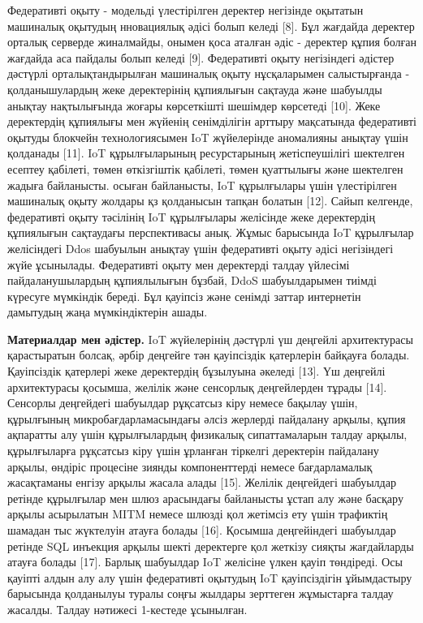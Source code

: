Федеративті оқыту - модельді үлестірілген деректер негізінде оқытатын
машиналық оқытудың нновациялық әдісі болып келеді {[}8{]}. Бұл жағдайда
деректер орталық серверде жиналмайды, онымен қоса аталған әдіс -
деректер құпия болған жағдайда аса пайдалы болып келеді {[}9{]}.
Федеративті оқыту негізіндегі әдістер дәстүрлі орталықтандырылған
машиналық оқыту нұсқаларымен салыстырғанда - қолданышулардың жеке
деректерінің құпиялығын сақтауда және шабуылды анықтау нақтылығында
жоғары көрсеткішті шешімдер көрсетеді {[}10{]}. Жеке деректердің
құпиялығы мен жүйенің сенімділігін арттыру мақсатында федеративті
оқытуды блокчейн технологиясымен IoT жүйелерінде аномалияны анықтау үшін
қолданады {[}11{]}. IoT құрылғыларының ресурстарының жетіспеушілігі
шектелген есептеу қабілеті, төмен өткізгіштік қабілеті, төмен қуаттылығы
және шектелген жадыға байланысты. осыған байланысты, IoT құрылғылары
үшін үлестірілген машиналық оқыту жолдары қз қолданысын тапқан болатын
{[}12{]}. Сайып келгенде, федеративті оқыту тәсілінің IoT құрылғылары
желісінде жеке деректердің құпиялығын сақтаудағы перспективасы анық.
Жұмыс барысында IoT құрылғылар желісіндегі Ddos шабуылын анықтау үшін
федеративті оқыту әдісі негізіндегі жүйе ұсынылады. Федеративті оқыту
мен деректерді талдау үйлесімі пайдаланушылардың құпиялылығын бұзбай,
DdoS шабуылдарымен тиімді күресуге мүмкіндік береді. Бұл қауіпсіз және
сенімді заттар интернетін дамытудың жаңа мүмкіндіктерін ашады.

{\bfseries Материалдар мен әдістер.} IoT жүйелерінің дәстүрлі үш деңгейлі
архитектурасы қарастыратын болсақ, әрбір деңгейге тән қауіпсіздік
қатерлерін байқауға болады. Қауіпсіздік қатерлері жеке деректердің
бұзылуына әкеледі {[}13{]}. Үш деңгейлі архитектурасы қосымша, желілік
және сенсорлық деңгейлерден тұрады {[}14{]}. Сенсорлы деңгейдегі
шабуылдар рұқсатсыз кіру немесе бақылау үшін, құрылғының
микробағдарламасындағы әлсіз жерлерді пайдалану арқылы, құпия ақпаратты
алу үшін құрылғылардың физикалық сипаттамаларын талдау арқылы,
құрылғыларға рұқсатсыз кіру үшін ұрланған тіркелгі деректерін пайдалану
арқылы, өндіріс процесіне зиянды компоненттерді немесе бағдарламалық
жасақтаманы енгізу арқылы жасала алады {[}15{]}. Желілік деңгейдегі
шабуылдар ретінде құрылғылар мен шлюз арасындағы байланысты ұстап алу
және басқару арқылы асырылатын MITM немесе шлюзді қол жетімсіз ету үшін
трафиктің шамадан тыс жүктелуін атауға болады {[}16{]}. Қосымша
деңгейіндегі шабуылдар ретінде SQL инъекция арқылы шекті деректерге қол
жеткізу сияқты жағдайларды атауға болады {[}17{]}. Барлық шабуылдар IoT
желісіне үлкен қауіп төндіреді. Осы қауіпті алдын алу алу үшін
федеративті оқытудың IoT қауіпсіздігін ұйымдастыру барысында қолданылуы
туралы соңғы жылдары зерттеген жұмыстарға талдау жасалды. Талдау
нәтижесі 1-кестеде ұсынылған.

